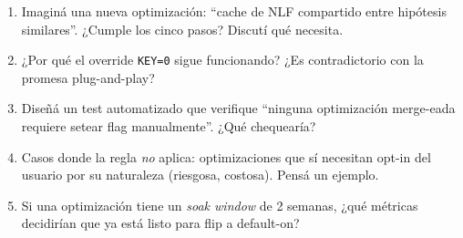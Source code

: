 \begin{ejercicios}
\begin{enumerate}
    \item \starred{} Imaginá una nueva optimización: ``cache de
    NLF compartido entre hipótesis similares''. ¿Cumple los cinco
    pasos? Discutí qué necesita.

    \item ¿Por qué el override \texttt{KEY=0} sigue funcionando?
    ¿Es contradictorio con la promesa plug-and-play?

    \item \starred{} Diseñá un test automatizado que verifique
    ``ninguna optimización merge-eada requiere setear flag
    manualmente''. ¿Qué chequearía?

    \item Casos donde la regla \emph{no} aplica: optimizaciones
    que sí necesitan opt-in del usuario por su naturaleza
    (riesgosa, costosa). Pensá un ejemplo.

    \item Si una optimización tiene un \emph{soak window} de 2
    semanas, ¿qué métricas decidirían que ya está listo para
    flip a default-on?
\end{enumerate}
\end{ejercicios}
